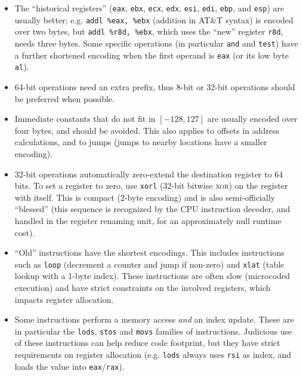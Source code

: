 \documentclass{llncs}
\begin{document}
\begin{itemize}

    \item The ``historical registers'' (\verb+eax+, \verb+ebx+, \verb+ecx+,
    \verb+edx+, \verb+esi+, \verb+edi+, \verb+ebp+, and \verb+esp+)
    are usually better; e.g. \verb+addl %eax, %ebx+ (addition in AT\&T
    syntax) is encoded over two bytes, but \verb+addl %r8d, %ebx+, which
    uses the ``new'' register \verb+r8d+, needs three bytes. Some
    specific operations (in particular \verb+and+ and \verb+test+) have
    a further shortened encoding when the first operand is \verb+eax+
    (or its low byte \verb+al+).

    \item 64-bit operations need an extra prefix, thus 8-bit or 32-bit
    operations should be preferred when possible.

    \item Immediate constants that do not fit in $[-128, 127]$ are
    usually encoded over four bytes, and should be avoided. This also
    applies to offsets in address calculations, and to jumps (jumps
    to nearby locations have a smaller encoding).

    \item 32-bit operations automatically zero-extend the destination
    register to 64 bits. To set a register to zero, use \verb+xorl+
    (32-bit bitwise \textsc{xor}) on the register with itself. This is
    compact (2-byte encoding) and is also semi-officially ``blessed''
    (this sequence is recognized by the CPU instruction decoder, and
    handled in the register renaming unit, for an approximately null
    runtime cost).

    \item ``Old'' instructions have the shortest encodings. This
    includes instructions such as \verb+loop+ (decrement a counter and
    jump if non-zero) and \verb+xlat+ (table lookup with a 1-byte
    index). These instructions are often slow (microcoded execution) and
    have strict constraints on the involved registers, which impacts
    register allocation.

    \item Some instructions perform a memory access \emph{and} an index
    update. These are in particular the \verb+lods+, \verb+stos+ and
    \verb+movs+ families of instructions. Judicious use of these
    instructions can help reduce code footprint, but they have strict
    requirements on register allocation (e.g. \verb+lods+ always uses
    \verb+rsi+ as index, and loads the value into
    \verb+eax+/\verb+rax+).


\end{itemize}
\end{document}
